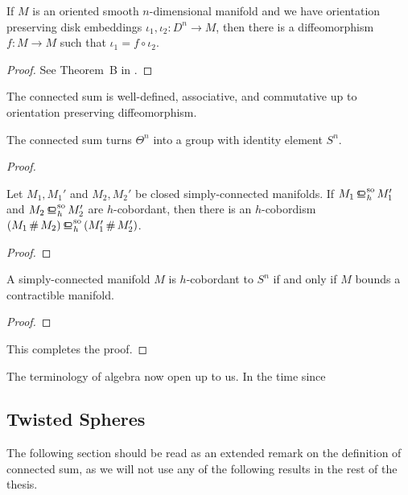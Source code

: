 \begin{theorem}
	If $M$ is an oriented smooth $n$-dimensional manifold and we have orientation preserving disk embeddings $\iota_1,\iota_2 : D^n \to M$, then there is a diffeomorphism $f : M \to M$ such that $\iota_1 = f\circ \iota_2$.
\end{theorem}
\begin{proof}
	See Theorem~B in \cite{palais1960extending}.
\end{proof}

\begin{corollary}
		The connected sum is well-defined, associative, and commutative up to orientation preserving diffeomorphism.
\end{corollary}

\begin{theorem}
	The connected sum turns $\Theta^n$ into a group with identity element $S^n$.
\end{theorem}
\begin{proof}

	\begin{changemargins}
	\begin{lemma}
		Let $M_1, M_1'$ and $M_2, M_2'$ be closed simply-connected manifolds. If $M_1\sohbord M_1'$ and $M_2\sohbord M_2'$ are $h$-cobordant, then there is an $h$-cobordism $(M_1\+ M_2) \sohbord (M_1'\+M_2')$.
	\end{lemma}
	\begin{proof}
	\end{proof}
	\end{changemargins}

	\begin{changemargins}
	\begin{lemma}
		A simply-connected manifold $M$ is $h$-cobordant to $S^n$ if and only if $M$ bounds a contractible manifold.
	\end{lemma}
	\begin{proof}
	\todo{write the proof}
	\end{proof}
	\end{changemargins}

	\noindent This completes the proof.
\end{proof}

The terminology of algebra now open up to us. In the time since 

\subsection{Twisted Spheres}
	The following section should be read as an extended remark on the definition of connected sum, as we will not use any of the following results in the rest of the thesis.

